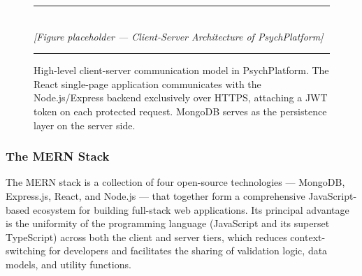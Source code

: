 \begin{figure}[H]
  \centering
  \rule{0.85\textwidth}{0.4pt}\\[6pt]
  {\small\itshape [Figure placeholder — Client-Server Architecture of PsychPlatform]}
  \rule{0.85\textwidth}{0.4pt}
  \caption{High-level client-server communication model in PsychPlatform.
           The React single-page application communicates with the Node.js/Express
           backend exclusively over HTTPS, attaching a JWT token on each protected
           request. MongoDB serves as the persistence layer on the server side.}
  \label{fig:client-server}
\end{figure}

\subsubsection{The MERN Stack}

The MERN stack is a collection of four open-source technologies — MongoDB,
Express.js, React, and Node.js — that together form a comprehensive
JavaScript-based ecosystem for building full-stack web applications. Its
principal advantage is the uniformity of the programming language (JavaScript
and its superset TypeScript) across both the client and server tiers, which
reduces context-switching for developers and facilitates the sharing of
validation logic, data models, and utility functions.

